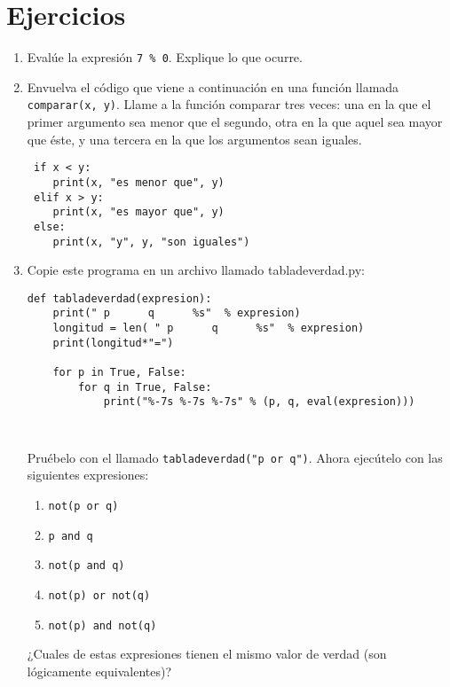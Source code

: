 \section{Ejercicios}
\begin{enumerate}
\item Evalúe la expresión \verb+7 % 0+. Explique lo que ocurre.
\item Envuelva el código que viene a continuación en una función llamada
\verb+comparar(x, y)+. Llame a la función comparar tres veces: una
en la que el primer argumento sea menor que el segundo, otra en la
que aquel sea mayor que éste, y una tercera en la que los argumentos
sean iguales. 
\begin{lstlisting}
 if x < y:
    print(x, "es menor que", y)
 elif x > y:
    print(x, "es mayor que", y)
 else:
    print(x, "y", y, "son iguales")
\end{lstlisting}
\item Copie este programa en un archivo llamado tabladeverdad.py: 
\begin{lstlisting}
def tabladeverdad(expresion):
    print(" p      q      %s"  % expresion)
    longitud = len( " p      q      %s"  % expresion)
    print(longitud*"=")

    for p in True, False:
        for q in True, False:
            print("%-7s %-7s %-7s" % (p, q, eval(expresion)))
\end{lstlisting}

\begin{verbatim}
 
\end{verbatim}
Pruébelo con el llamado \verb+tabladeverdad("p or q")+. Ahora ejecútelo
con las siguientes expresiones: 
\begin{enumerate}
\item \texttt{\textquotedbl{}not(p or q)\textquotedbl{}} 
\item \texttt{\textquotedbl{}p and q\textquotedbl{}} 
\item \texttt{\textquotedbl{}not(p and q)\textquotedbl{}} 
\item \texttt{\textquotedbl{}not(p) or not(q)\textquotedbl{}} 
\item \texttt{\textquotedbl{}not(p) and not(q)\textquotedbl{} }
\end{enumerate}
¿Cuales de estas expresiones tienen el mismo valor de verdad (son
lógicamente equivalentes)?
\end{enumerate}

